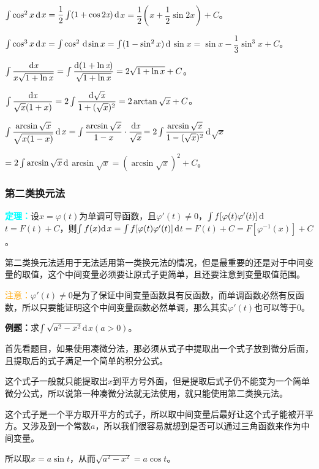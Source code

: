 \documentclass[UTF8, 12pt]{ctexart}
\begin{document}
$\int\cos^2x\,\rm{d}$$x=\dfrac{1}{2}\int(1+\cos 2\textit{x})\,\rm{d}$$x=\dfrac{1}{2}\left(x+\dfrac{1}{2}\sin 2x\right)+C$。

$\int\cos^3x\,\rm{d}$$x=\int\cos^2\,\rm{d}$$\sin x=\int(1-\sin^2x)\,\rm{d}$$\sin x=\sin x-\dfrac{1}{3}\sin^3x+C$。

$\int\dfrac{\rm{d}\textit{x}}{x\sqrt{1+\ln x}}=\int\dfrac{\rm{d}(1+\ln\textit{x})}{\sqrt{1+\ln x}}=2\sqrt{1+\ln x}+C$。

$\int\dfrac{\rm{d}\textit{x}}{\sqrt{x}(1+x)}=2\int\dfrac{\rm{d}\sqrt{\textit{x}}}{1+(\sqrt{x})^2}=2\arctan\sqrt{x}+C$。

$\int\dfrac{\arcsin\sqrt{x}}{\sqrt{x(1-x)}}\,\rm{d}$$x=\int\dfrac{\arcsin\sqrt{x}}{1-x}\cdot\dfrac{\rm{d}\textit{x}}{\sqrt{x}}$$=2\int\dfrac{\arcsin\sqrt{x}}{1-(\sqrt{x})^2}\,\rm{d}$$\sqrt{x}$

$=2\int\arcsin\sqrt{x}\,\rm{d}$$\arcsin\sqrt{x}=(\arcsin\sqrt{x})^2+C$。

\subsubsection{第二类换元法}

\textcolor{aqua}{\textbf{定理：}}设$x=\varphi(t)$为单调可导函数，且$\varphi'(t)\neq 0$，$\int f[\varphi(t)\varphi'(t)]\,\rm{d}$$t=F(t)+C$，则$\int f(x)\rm{d}$$x=\int f[\varphi(t)\varphi'(t)]\,\rm{d}$$t=F(t)+C=F[\varphi^{-1}(x)]+C$。

第二类换元法适用于无法适用第一类换元法的情况，但是最重要的还是对于中间变量的取值，这个中间变量必须要让原式子更简单，且还要注意到变量取值范围。

\textcolor{orange}{注意：}$\varphi'(t)\neq 0$是为了保证中间变量函数具有反函数，而单调函数必然有反函数，所以只要能证明这个中间变量函数必然单调，那么其实$\varphi'(t)$也可以等于0。

\textbf{例题：}求$\int\sqrt{a^2-x^2}\,\rm{d}$$x(a>0)$。

首先看题目，如果使用凑微分法，那必须从式子中提取出一个式子放到微分后面，且提取后的式子满足一个简单的积分公式。

这个式子一般就只能提取出$x$到平方号外面，但是提取后式子仍不能变为一个简单微分公式，所以说第一种凑微分法就无法使用，就只能使用第二类换元法。

这个式子是一个平方取开平方的式子，所以取中间变量后最好让这个式子能被开平方。又涉及到一个常数$a$，所以我们很容易就想到是否可以通过三角函数来作为中间变量。

所以取$x=a\sin t$，从而$\sqrt{a^2-x^2}=a\cos t$。
\end{document}
